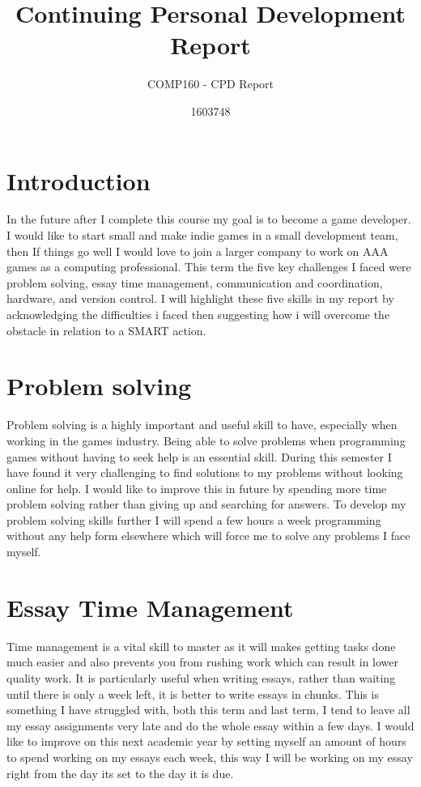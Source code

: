 \documentclass{scrartcl}
\title{Continuing Personal Development Report}
\subtitle{COMP160 - CPD Report}
\author{1603748}
\begin{document}
\maketitle

\section*{Introduction}
In the future after I complete this course my goal is to become a game developer. I would like to start small and make indie games in a small development team, then If things go well I would love to join a larger company to work on AAA games as a computing professional. This term the five key challenges I faced were problem solving, essay time management, communication and coordination, hardware, and version control. I will highlight these five skills in my report by acknowledging the difficulties i faced then suggesting how i will overcome the obstacle in relation to a SMART action. 

\section{Problem solving}
Problem solving is a highly important and useful skill to have, especially when working in the games industry. Being able to solve problems when programming games without having to seek help is an essential skill. During this semester I have found it very challenging to find solutions to my problems without looking online for help. I would like to improve this in future by spending more time problem solving rather than giving up and searching for answers. To develop my problem solving skills further I will spend a few hours a week programming without any help form elsewhere which will force me to solve any problems I face myself. 

\section{Essay Time Management}
Time management is a vital skill to master as it will makes getting tasks done much easier and also prevents you from rushing work which can result in lower quality work. It is particularly useful when writing essays, rather than waiting until there is only a week left, it is better to write essays in chunks. This is something I have struggled with, both this term and last term, I tend to leave all my essay assignments very late and do the whole essay within a few days. I would like to improve on this next academic year by setting myself an amount of hours to spend working on my essays each week, this way I will be working on my essay right from the day its set to the day it is due. 
\end{document}
